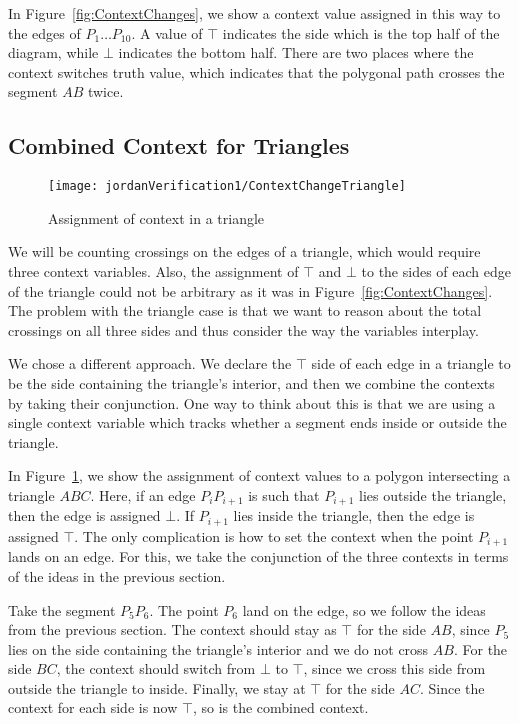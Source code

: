 In Figure~\ref{fig:ContextChanges}, we show a context value assigned in this way to the edges of $P_1\ldots P_{10}$. A value of $\top$ indicates the side which is the top half of the diagram, while $\bot$ indicates the bottom half. There are two places where the context switches truth value, which indicates that the polygonal path crosses the segment $AB$ twice.

\subsection{Combined Context for Triangles}
\begin{figure}
\centering\texttt{[image: jordanVerification1/ContextChangeTriangle]}
\caption{Assignment of context in a triangle}
\label{fig:ContextChangesTriangle}
\end{figure}

We will be counting crossings on the edges of a triangle, which would require three context variables. Also, the assignment of $\top$ and $\bot$ to the sides of each edge of the triangle could not be arbitrary as it was in Figure~\ref{fig:ContextChanges}. The problem with the triangle case is that we want to reason about the total crossings on all three sides and thus consider the way the variables interplay.

We chose a different approach. We declare the $\top$ side of each edge in a triangle to be the side containing the triangle's interior, and then we combine the contexts by taking their conjunction. One way to think about this is that we are using a single context variable which tracks whether a segment ends inside or outside the triangle.

In Figure~\ref{fig:ContextChangesTriangle}, we show the assignment of context values to a polygon intersecting a triangle $ABC$. Here, if an edge $P_iP_{i+1}$ is such that $P_{i+1}$ lies outside the triangle, then the edge is assigned $\bot$. If $P_{i+1}$ lies inside the triangle, then the edge is assigned $\top$. The only complication is how to set the context when the point $P_{i+1}$ lands on an edge. For this, we take the conjunction of the three contexts in terms of the ideas in the previous section.

Take the segment $P_5P_6$. The point $P_6$ land on the edge, so we follow the ideas from the previous section. The context should stay as $\top$ for the side $AB$, since $P_5$ lies on the side containing the triangle's interior and we do not cross $AB$. For the side $BC$, the context should switch from $\bot$ to $\top$, since we cross this side from outside the triangle to inside. Finally, we stay at $\top$ for the side $AC$. Since the context for each side is now $\top$, so is the combined context.

